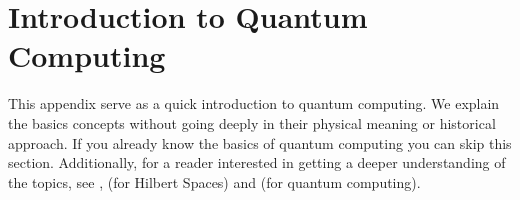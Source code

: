 
\chapter{Introduction to Quantum Computing} %
This appendix serve as a quick introduction to quantum computing. We explain the basics concepts without going deeply in their physical meaning or historical approach. If you already know the basics of quantum computing you can skip this section. Additionally, for a reader interested in getting a deeper understanding of the topics, see \cite{W.Bryon1992HilbertFunctions},  \cite{Scherer2019MathematicsComputing} (for Hilbert Spaces) and \cite{Nielsen2010QuantumInformation} (for quantum computing).\\


\label{AppendixA} %

